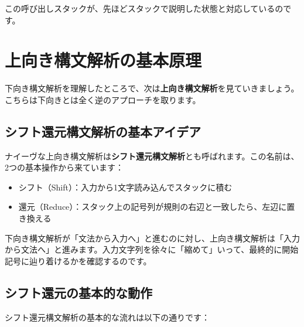 この呼び出しスタックが、先ほどスタックで説明した状態と対応しているのです。

\hypertarget{chapter5-ux4e0aux5411ux304dux69cbux6587ux89e3ux6790ux306eux57faux672cux539fux7406}{%
\section{上向き構文解析の基本原理}\label{chapter5-ux4e0aux5411ux304dux69cbux6587ux89e3ux6790ux306eux57faux672cux539fux7406}}

下向き構文解析を理解したところで、次は\textbf{上向き構文解析}を見ていきましょう。こちらは下向きとは全く逆のアプローチを取ります。

\hypertarget{chapter5-ux30b7ux30d5ux30c8ux9084ux5143ux69cbux6587ux89e3ux6790ux306eux57faux672cux30a2ux30a4ux30c7ux30a2}{%
\subsection{シフト還元構文解析の基本アイデア}\label{chapter5-ux30b7ux30d5ux30c8ux9084ux5143ux69cbux6587ux89e3ux6790ux306eux57faux672cux30a2ux30a4ux30c7ux30a2}}

ナイーヴな上向き構文解析は\textbf{シフト還元構文解析}とも呼ばれます。この名前は、2つの基本操作から来ています：

\begin{itemize}
\tightlist
\item
  シフト（Shift）：入力から1文字読み込んでスタックに積む
\item
  還元（Reduce）：スタック上の記号列が規則の右辺と一致したら、左辺に置き換える
\end{itemize}

下向き構文解析が「文法から入力へ」と進むのに対し、上向き構文解析は「入力から文法へ」と進みます。入力文字列を徐々に「縮めて」いって、最終的に開始記号に辿り着けるかを確認するのです。

\hypertarget{chapter5-ux30b7ux30d5ux30c8ux9084ux5143ux306eux57faux672cux7684ux306aux52d5ux4f5c}{%
\subsection{シフト還元の基本的な動作}\label{chapter5-ux30b7ux30d5ux30c8ux9084ux5143ux306eux57faux672cux7684ux306aux52d5ux4f5c}}

シフト還元構文解析の基本的な流れは以下の通りです：

